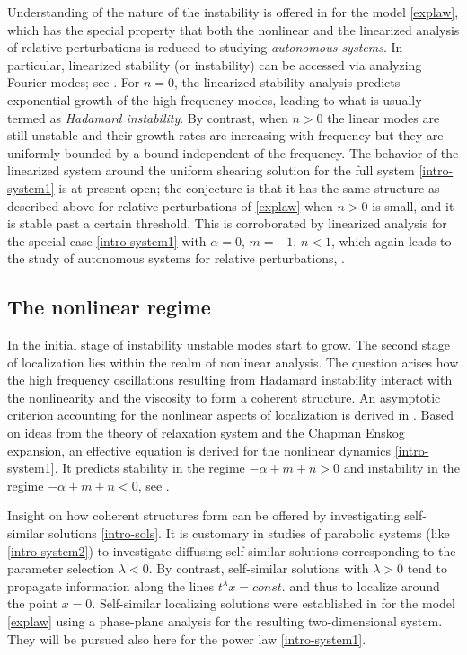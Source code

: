\documentclass[usletter,11pt]{article}
\theoremstyle{remark}
\begin{document}
Understanding of the nature of the instability is offered in \cite{KOT14} for the model \eqref{explaw}, which has the special property
that both the nonlinear and the linearized analysis of relative perturbations is reduced to studying {\it autonomous systems}.
In particular, linearized stability (or instability) can be accessed  via analyzing Fourier modes; see \cite{KOT14}.
For $n=0$, the linearized stability analysis predicts  exponential growth of the high frequency modes, leading to what is usually termed as {\it Hadamard instability}. 
By contrast, when $n > 0$ the linear modes are still unstable and their growth rates are increasing with frequency but they are 
uniformly bounded by a bound independent of the frequency.  The behavior of the linearized system around the uniform shearing solution 
for the full system \eqref{intro-system1} is at present open;  the conjecture is that it has the same structure as described above for relative perturbations of \eqref{explaw} when $n>0$ is small,
and it is stable past a certain threshold.
This is corroborated by linearized analysis for the special case \eqref{intro-system1} with $\alpha =0$, $m =-1$, $n <1$, which again 
leads to the study of autonomous systems for relative perturbations, \cite{KLT_2016}. 



\subsection{The nonlinear regime}

In the initial stage of instability  unstable modes start to grow. 
The second stage of localization lies within the realm of nonlinear analysis. The  question arises
 how the high frequency oscillations resulting from Hadamard instability interact with
the nonlinearity and the viscosity to form a coherent structure.
An asymptotic criterion accounting for the nonlinear aspects of localization is derived in \cite{KT09}.
Based on ideas from the theory of relaxation system and the Chapman Enskog expansion,  an effective equation is derived for the nonlinear dynamics \eqref{intro-system1}.
It predicts stability in the regime $- \alpha + m + n > 0$ and instability in the regime $-\alpha + m + n < 0$, see \cite{KT09}.


Insight on how coherent structures form can be offered by investigating self-similar solutions \eqref{intro-sols}.
It is customary in studies of parabolic systems (like \eqref{intro-system2}) to investigate diffusing self-similar
solutions corresponding to the parameter selection $\lambda < 0$. By contrast, self-similar solutions with  $\lambda > 0$ tend to propagate information
along the lines $t^\lambda x = const.$ and thus to localize around the point $x=0$.
Self-similar localizing solutions were established in \cite{KOT14}  for the model \eqref{explaw}  using a phase-plane analysis for the resulting two-dimensional 
system. They will be pursued also here for the power law 
 \eqref{intro-system1}.
\end{document}
